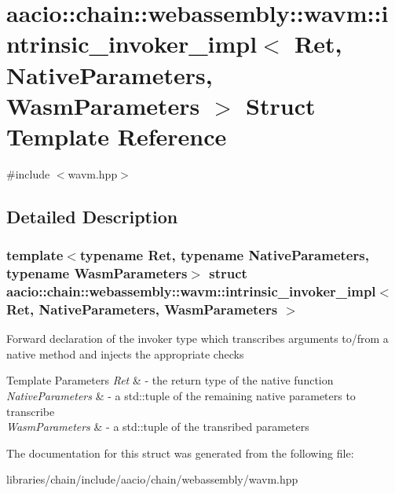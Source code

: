 \hypertarget{structaacio_1_1chain_1_1webassembly_1_1wavm_1_1intrinsic__invoker__impl}{}\section{aacio\+:\+:chain\+:\+:webassembly\+:\+:wavm\+:\+:intrinsic\+\_\+invoker\+\_\+impl$<$ Ret, Native\+Parameters, Wasm\+Parameters $>$ Struct Template Reference}
\label{structaacio_1_1chain_1_1webassembly_1_1wavm_1_1intrinsic__invoker__impl}


{\ttfamily \#include $<$wavm.\+hpp$>$}



\subsection{Detailed Description}
\subsubsection*{template$<$typename Ret, typename Native\+Parameters, typename Wasm\+Parameters$>$\newline
struct aacio\+::chain\+::webassembly\+::wavm\+::intrinsic\+\_\+invoker\+\_\+impl$<$ Ret, Native\+Parameters, Wasm\+Parameters $>$}

Forward declaration of the invoker type which transcribes arguments to/from a native method and injects the appropriate checks


\begin{DoxyTemplParams}{Template Parameters}
{\em Ret} & -\/ the return type of the native function \\
\hline
{\em Native\+Parameters} & -\/ a std\+::tuple of the remaining native parameters to transcribe \\
\hline
{\em Wasm\+Parameters} & -\/ a std\+::tuple of the transribed parameters \\
\hline
\end{DoxyTemplParams}


The documentation for this struct was generated from the following file\+:\begin{DoxyCompactItemize}
\item 
libraries/chain/include/aacio/chain/webassembly/wavm.\+hpp\end{DoxyCompactItemize}
